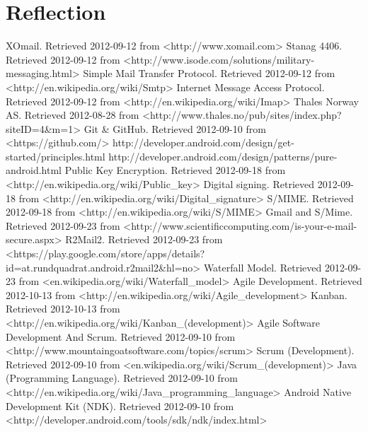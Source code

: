\documentclass[12pt]{report}
\begin{document}
\chapter{Reflection}

\printglossaries
{}

\begin{thebibliography}{99}
 XOmail. Retrieved 2012-09-12 from <http://www.xomail.com>
 Stanag 4406. Retrieved 2012-09-12 from <http://www.isode.com/solutions/military-messaging.html>
 Simple Mail Transfer Protocol. Retrieved 2012-09-12 from <http://en.wikipedia.org/wiki/Smtp>
 Internet Message Access Protocol. Retrieved 2012-09-12 from <http://en.wikipedia.org/wiki/Imap>
 Thales Norway AS. Retrieved 2012-08-28 from <http://www.thales.no/pub/sites/index.php?siteID=4\&m=1>
 Git \& GitHub. Retrieved 2012-09-10 from <https://github.com/>
 http://developer.android.com/design/get-started/principles.html
 http://developer.android.com/design/patterns/pure-android.html
 Public Key Encryption. Retrieved 2012-09-18 from <http://en.wikipedia.org/wiki/Public\_key>
 Digital signing. Retrieved 2012-09-18 from <http://en.wikipedia.org/wiki/Digital\_signature>
 S/MIME. Retrieved 2012-09-18 from <http://en.wikipedia.org/wiki/S/MIME>
 Gmail and S/Mime. Retrieved 2012-09-23 from <http://www.scientificcomputing.com/is-your-e-mail-secure.aspx>
 R2Mail2. Retrieved 2012-09-23 from <https://play.google.com/store/apps/details?id=at.rundquadrat.android.r2mail2\&hl=no>
 Waterfall Model. Retrieved 2012-09-23 from <en.wikipedia.org/wiki/Waterfall\_model>
 Agile Development. Retrieved 2012-10-13 from <http://en.wikipedia.org/wiki/Agile\_development>
 Kanban. Retrieved 2012-10-13 from <http://en.wikipedia.org/wiki/Kanban\_(development)>
 Agile Software Development And Scrum. Retrieved 2012-09-10 from <http://www.mountaingoatsoftware.com/topics/scrum>
 Scrum (Development). Retrieved 2012-09-10 from <en.wikipedia.org/wiki/Scrum\_(development)>
 Java (Programming Language). Retrieved 2012-09-10 from
<http://en.wikipedia.org/wiki/Java\_programming\_language>
 Android Native Development Kit (NDK). Retrieved 2012-09-10 from <http://developer.android.com/tools/sdk/ndk/index.html>

\end{thebibliography}
\end{document}
